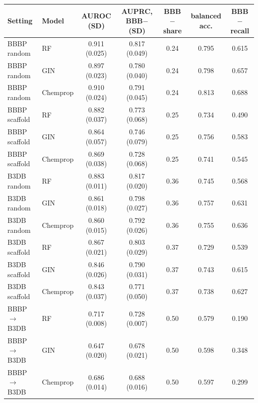 \begin{tabular}{llccccc}
\toprule
Setting & Model & AUROC (SD) & AUPRC, BBB$-$ (SD) & BBB$-$ share & balanced acc. & BBB$-$ recall\\
\midrule
BBBP random & RF & 0.911 (0.025) & 0.817 (0.049) & 0.24 & 0.795 & 0.615\\
BBBP random & GIN & 0.897 (0.023) & 0.780 (0.040) & 0.24 & 0.798 & 0.657\\
BBBP random & Chemprop & 0.910 (0.024) & 0.791 (0.045) & 0.24 & 0.813 & 0.688\\
BBBP scaffold & RF & 0.882 (0.037) & 0.773 (0.068) & 0.25 & 0.734 & 0.490\\
BBBP scaffold & GIN & 0.864 (0.057) & 0.746 (0.079) & 0.25 & 0.756 & 0.583\\
BBBP scaffold & Chemprop & 0.869 (0.038) & 0.728 (0.068) & 0.25 & 0.741 & 0.545\\
B3DB random & RF & 0.883 (0.011) & 0.817 (0.020) & 0.36 & 0.745 & 0.568\\
B3DB random & GIN & 0.861 (0.018) & 0.798 (0.027) & 0.36 & 0.757 & 0.631\\
B3DB random & Chemprop & 0.860 (0.015) & 0.792 (0.026) & 0.36 & 0.755 & 0.636\\
B3DB scaffold & RF & 0.867 (0.021) & 0.803 (0.029) & 0.37 & 0.729 & 0.539\\
B3DB scaffold & GIN & 0.846 (0.026) & 0.790 (0.031) & 0.37 & 0.743 & 0.615\\
B3DB scaffold & Chemprop & 0.843 (0.037) & 0.771 (0.050) & 0.37 & 0.738 & 0.627\\
BBBP$\to$B3DB & RF & 0.717 (0.008) & 0.728 (0.007) & 0.50 & 0.579 & 0.190\\
BBBP$\to$B3DB & GIN & 0.647 (0.020) & 0.678 (0.021) & 0.50 & 0.598 & 0.348\\
BBBP$\to$B3DB & Chemprop & 0.686 (0.014) & 0.688 (0.016) & 0.50 & 0.597 & 0.299\\
\bottomrule
\end{tabular}
